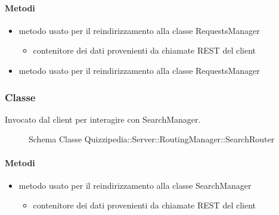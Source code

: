 \paragraph{Metodi}
\begin{itemize}
\item {}
\newline
metodo usato per il reindirizzamento alla classe RequestsManager
\newline
{}
\newline
\begin{itemize}
\item {}
\newline
contenitore dei dati provenienti da chiamate REST del client
\end{itemize}
\item {}
\newline
metodo usato per il reindirizzamento alla classe RequestsManager
\newline
\end{itemize}
\subsubsection{Classe }
Invocato dal client per interagire con SearchManager.
\begin{figure}[H]
\centering
\noindent{}
\caption[Schema Classe SearchRouter]{Schema Classe Quizzipedia::Server::RoutingManager::SearchRouter}
\end{figure}
\paragraph{Metodi}
\begin{itemize}
\item {}
\newline
metodo usato per il reindirizzamento alla classe SearchManager
\newline
{}
\newline
\begin{itemize}
\item {}
\newline
contenitore dei dati provenienti da chiamate REST del client
\end{itemize}
\end{itemize}

